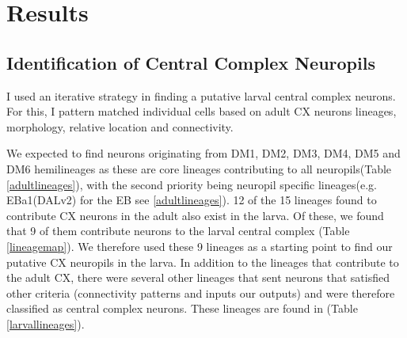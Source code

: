 \chapter{Results}

\section{Identification of Central Complex Neuropils}%
I used an iterative strategy in finding a putative larval central complex neurons. For this, I pattern matched individual cells based on adult CX neurons lineages, morphology, relative location and connectivity. %


We expected to find neurons originating from DM1, DM2, DM3, DM4, DM5 and DM6 hemilineages as these are core lineages contributing to all neuropils(Table \ref{adultlineages}), with the second priority being neuropil specific lineages(e.g. EBa1(DALv2) for the EB see \ref{adultlineages}). 12 of the 15 lineages found to contribute CX neurons in the adult also exist in the larva. Of these, we found that 9 of them contribute neurons to the larval central complex (Table \ref{lineagemap}). We therefore used these 9 lineages as a starting point to find our putative CX neuropils in the larva.
In addition to the lineages that contribute to the adult CX, there were several other lineages that sent neurons that satisfied other criteria (connectivity patterns and inputs our outputs) and were therefore classified as central complex neurons. These lineages are found in (Table \ref{larvallineages}).

